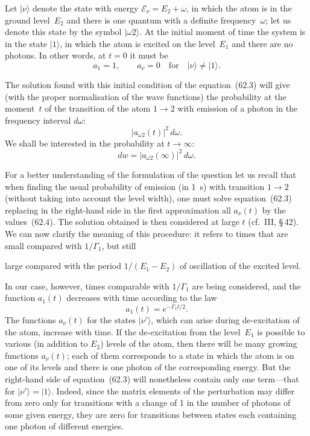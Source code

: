 Let $|\nu\rangle$ denote the state with energy $\mathcal{E}_\nu = E_2 + \omega$, in which the atom is in the ground level~$E_2$ and there is one quantum with a definite frequency~$\omega$; let us denote this state by the symbol $|\omega 2\rangle$. At the initial moment of time the system is in the state $|1\rangle$, in which the atom is excited on the level~$E_1$ and there are no photons. In other words, at $t = 0$ it must be
\begin{equation}
a_1 = 1,\qquad a_\nu = 0\quad\text{for}\quad |\nu\rangle \neq |1\rangle.
\tag{62.4}
\end{equation}

The solution found with this initial condition of the equation~(62.3) will give (with the proper normalisation of the wave functions) the probability at the moment~$t$ of the transition of the atom $1 \to 2$ with emission of a photon in the frequency interval $d\omega$:
\begin{equation}
|a_{\omega 2}(t)|^2\,d\omega.
\tag{62.5}
\end{equation}
We shall be interested in the probability at $t \to \infty$:
\begin{equation}
dw = |a_{\omega 2}(\infty)|^2\,d\omega.
\tag{62.5}
\end{equation}

For a better understanding of the formulation of the question let us recall that when finding the usual probability of emission (in 1~s) with transition $1 \to 2$ (without taking into account the level width), one must solve equation~(62.3) replacing in the right-hand side in the first approximation all $a_\nu(t)$ by the values~(62.4). The solution obtained is then considered at large $t$ (cf.~III, \S\,42). We can now clarify the meaning of this procedure: it refers to times that are small compared with $1/\Gamma_1$, but still

large compared with the period $1/(E_1 - E_2)$ of oscillation of the excited level.

In our case, however, times comparable with $1/\Gamma_1$ are being considered, and the function $a_1(t)$ decreases with time according to the law
\begin{equation}
a_1(t) = e^{-\Gamma_1 t/2}.
\tag{62.6}
\end{equation}
The functions $a_\nu(t)$ for the states $|\nu'\rangle$, which can arise during de-excitation of the atom, increase with time. If the de-excitation from the level~$E_1$ is possible to various (in addition to $E_2$) levels of the atom, then there will be many growing functions $a_\nu(t)$; each of them corresponds to a state in which the atom is on one of its levels and there is one photon of the corresponding energy. But the right-hand side of equation~(62.3) will nonetheless contain only one term---that for $|\nu'\rangle = |1\rangle$. Indeed, since the matrix elements of the perturbation may differ from zero only for transitions with a change of 1 in the number of photons of some given energy, they are zero for transitions between states each containing one photon of different energies.

